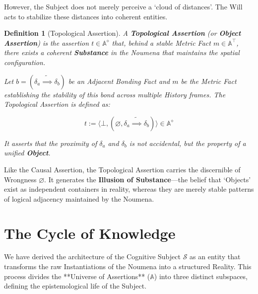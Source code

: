 \documentclass[11pt, a4paper]{article}
\theoremstyle{formalism}
\newtheorem{formalism}{Definition}
\begin{document}
However, the Subject does not merely perceive a `cloud of distances'. The Will acts to stabilize these distances into coherent entities.

\begin{formalism}[Topological Assertion]

    A \textbf{Topological Assertion} (or \textbf{Object Assertion}) is the assertion $t \in \mathbb{A}^\diamond$ that, behind a stable Metric Fact $m \in \mathbb{A}^\top$, there exists a coherent \textbf{Substance} in the Noumena that maintains the spatial configuration.

    Let $b = (\delta_a \tilde{\implies} \delta_b)$ be an Adjacent Bonding Fact and $m$ be the Metric Fact establishing the stability of this bond across multiple History frames. The Topological Assertion is defined as:

    \begin{equation}
        t := \langle \bot, (\varnothing, \delta_a \tilde{\implies} \delta_b) \rangle \in \mathbb{A}^\diamond
    \end{equation}

    It asserts that the proximity of $\delta_a$ and $\delta_b$ is not accidental, but the property of a unified \textbf{Object}.
    
\end{formalism}

Like the Causal Assertion, the Topological Assertion carries the discernible of Wrongness $\varnothing$. It generates the \textbf{Illusion of Substance}---the belief that `Objects' exist as independent containers in reality, whereas they are merely stable patterns of logical adjacency maintained by the Noumena. 

\section{The Cycle of Knowledge}

We have derived the architecture of the Cognitive Subject $\mathcal{S}$ as an entity that transforms the raw Instantiations of the Noumena into a structured Reality. This process divides the **Universe of Assertions** ($\mathbb{A}$) into three distinct subspaces, defining the epistemological life of the Subject.
\end{document}
